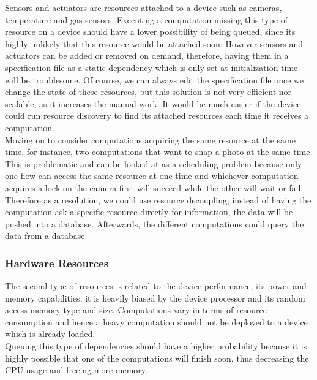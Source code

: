   Sensors and actuators are resources attached to a device such as cameras, temperature and gas sensors. Executing a computation missing this type of resource on a device should have a lower possibility of being queued, since its highly unlikely that this resource would be attached soon. However sensors and actuators can be added or removed on demand, therefore, having them in a specification file as a static dependency which is only set at initialization time will be troublesome. Of course, we can always edit the specification file once we change the state of these resources, but this solution is not very efficient nor scalable, as it increases the manual work. It would be much easier if the device could run resource discovery to find its attached resources each time it receives a computation. \\
  
  \noindent Moving on to consider computations acquiring the same resource at the same time, for instance, two computations that want to snap a photo at the same time. This is problematic and can be looked at as a scheduling problem because only one flow can access the same resource at one time and whichever computation acquires a lock on the camera first will succeed while the other will wait or fail. Therefore as a resolution, we could use resource decoupling; instead of having the computation ask a specific resource directly for information, the  data will be pushed into a database. Afterwards, the different computations could query the data from a database.
  
  

\subsubsection{Hardware Resources }

The second type of resources is related to the device performance, its power and memory capabilities, it is heavily biased by the  device processor  and its random access memory type and size. Computations vary in terms of resource consumption and hence a heavy computation should not be deployed to a device which is already loaded. \\

\noindent Queuing this type of dependencies should have a higher probability because it is highly possible that one of the computations will finish soon, thus decreasing the CPU usage and freeing more memory.







